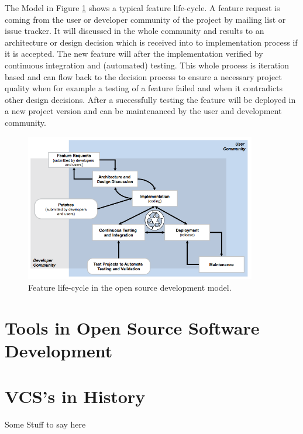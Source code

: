 \documentclass[DIV=calc,paper=a4,fontsize=11pt,twocolumn]{scrartcl}
\begin{document}
The Model in Figure \ref{fig:feature-life-cycle} shows a typical feature life-cycle. A feature request is coming from the user or developer community of the project by mailing list or issue tracker. It will discussed in the whole community and results to an architecture or design decision which is received into to implementation process if it is accepted. The new feature will after the implementation verified by continuous integration and (automated) testing. This whole process is iteration based and can flow back to the decision process to ensure a necessary project quality when for example a testing of a feature failed and when it contradicts other design decisions. After a successfully testing the feature will be deployed in a new project version and can be maintenanced by the user and development community. \citep{Haddad11}

\begin{figure}[ht]
    \includegraphics[width=0.9\textwidth ]{img/feature-life-cycle.png}{}
    \centering
    \caption{Feature life-cycle in the open source development model. \citet{Haddad11}}\label{fig:feature-life-cycle}
\end{figure}

\section{Tools in Open Source Software Development}




\section{VCS's in History}
Some Stuff to say here



\end{document}
